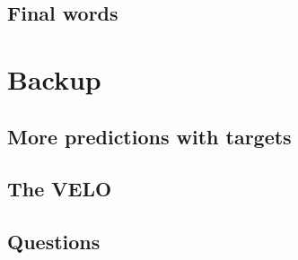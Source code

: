 \documentclass[aspectratio=169, 10pt]{beamer}
\begin{document}
\subsection{Final words}




\backupbegin
\section{Backup}

\subsection{More predictions with targets}


\subsection{The VELO}


\subsection{Questions}




\backupend
\end{document}
